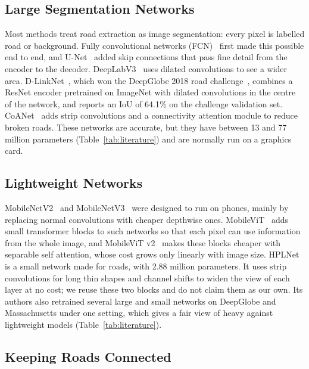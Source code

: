 \documentclass{ieeeaccess}
\begin{document}
\subsection{Large Segmentation Networks}

Most methods treat road extraction as image segmentation: every pixel is labelled road or background. Fully convolutional networks (FCN)~\cite{long2015fcn} first made this possible end to end, and U-Net~\cite{ronneberger2015unet} added skip connections that pass fine detail from the encoder to the decoder. DeepLabV3~\cite{chen2017deeplab} uses dilated convolutions to see a wider area. D-LinkNet~\cite{zhou2018dlinknet}, which won the DeepGlobe 2018 road challenge~\cite{demir2018deepglobe}, combines a ResNet encoder pretrained on ImageNet with dilated convolutions in the centre of the network, and reports an IoU of 64.1\% on the challenge validation set. CoANet~\cite{mei2021coanet} adds strip convolutions and a connectivity attention module to reduce broken roads. These networks are accurate, but they have between 13 and 77 million parameters (Table~\ref{tab:literature}) and are normally run on a graphics card.

\subsection{Lightweight Networks}

MobileNetV2~\cite{sandler2018mobilenetv2} and MobileNetV3~\cite{howard2019mobilenetv3} were designed to run on phones, mainly by replacing normal convolutions with cheaper depthwise ones. MobileViT~\cite{mehta2022mobilevit} adds small transformer blocks to such networks so that each pixel can use information from the whole image, and MobileViT v2~\cite{mehta2023separable} makes these blocks cheaper with separable self attention, whose cost grows only linearly with image size. HPLNet~\cite{cui2025hplnet} is a small network made for roads, with 2.88 million parameters. It uses strip convolutions for long thin shapes and channel shifts to widen the view of each layer at no cost; we reuse these two blocks and do not claim them as our own. Its authors also retrained several large and small networks on DeepGlobe and Massachusetts under one setting, which gives a fair view of heavy against lightweight models (Table~\ref{tab:literature}).

\subsection{Keeping Roads Connected}
\end{document}
